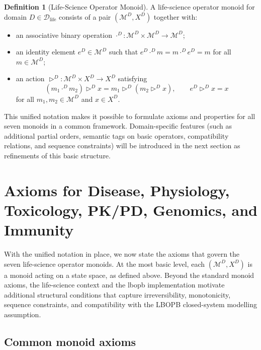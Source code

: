\documentclass[11pt]{book}
\theoremstyle{plain}
\theoremstyle{definition}
\newtheorem{definition}[theorem]{Definition}
\theoremstyle{remark}
\begin{document}
\begin{definition}[Life-Science Operator Monoid]
A life-science operator monoid for domain $D \in \mathcal{D}_{\mathrm{life}}$
consists of a pair $(\mathcal{M}^{D}, X^{D})$ together with:
\begin{itemize}
  \item an associative binary operation
        $\cdot^{D} \colon \mathcal{M}^{D} \times \mathcal{M}^{D}
        \to \mathcal{M}^{D}$;
  \item an identity element $e^{D} \in \mathcal{M}^{D}$ such that
        $e^{D} \cdot^{D} m = m \cdot^{D} e^{D} = m$ for all
        $m \in \mathcal{M}^{D}$;
  \item an action $\triangleright^{D} \colon \mathcal{M}^{D} \times X^{D}
        \to X^{D}$ satisfying
        \[
          (m_{1} \cdot^{D} m_{2}) \triangleright^{D} x
          = m_{1} \triangleright^{D}
            (m_{2} \triangleright^{D} x),
          \qquad
          e^{D} \triangleright^{D} x = x
        \]
        for all $m_{1}, m_{2} \in \mathcal{M}^{D}$ and $x \in X^{D}$.
\end{itemize}
\end{definition}

This unified notation makes it possible to formulate axioms and
properties for all seven monoids in a common framework. Domain-specific
features (such as additional partial orders, semantic tags on basic
operators, compatibility relations, and sequence constraints) will be
introduced in the next section as refinements of this basic structure.

\section{Axioms for Disease, Physiology, Toxicology, PK/PD, Genomics, and Immunity}


With the unified notation in place, we now state the axioms that
govern the seven life-science operator monoids. At the most basic
level, each $(\mathcal{M}^{D}, X^{D})$ is a monoid acting on a state
space, as defined above. Beyond the standard monoid axioms, the
life-science context and the lbopb implementation motivate additional
structural conditions that capture irreversibility, monotonicity,
sequence constraints, and compatibility with the LBOPB closed-system
modelling assumption.

\subsection*{Common monoid axioms}
\end{document}
